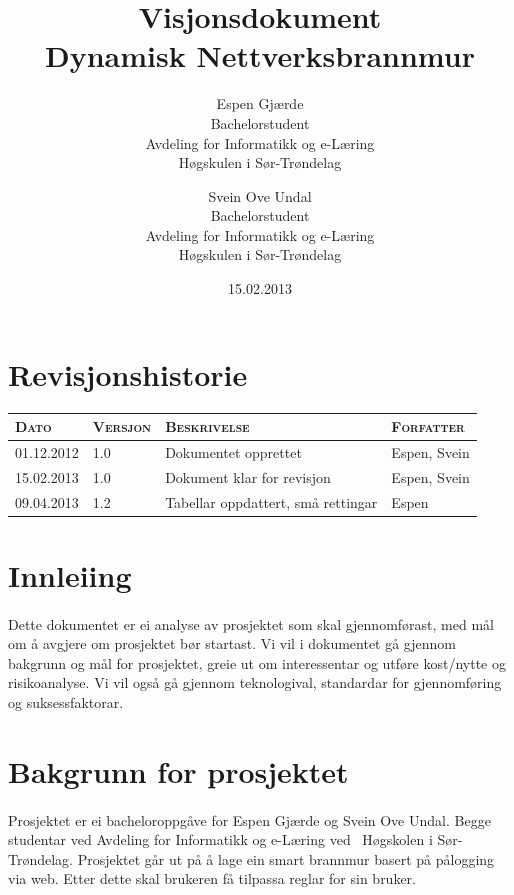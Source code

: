 \documentclass[nynorsk,12pt,a4paper]{article}
\title{Visjonsdokument\\
Dynamisk Nettverksbrannmur
}
\author{Espen Gjærde \\
Bachelorstudent \\
Avdeling for Informatikk og e-Læring \\
Høgskulen i Sør-Trøndelag \and Svein Ove Undal\\
Bachelorstudent \\
Avdeling for Informatikk og e-Læring \\
Høgskulen i Sør-Trøndelag}
\date{15.02.2013}
\begin{document}
\maketitle
\newpage

\section*{Revisjonshistorie}

\begin{table}[h!]
	\begin{tabular}{ l l l l }

		\textsc{Dato} & \textsc{Versjon} & \textsc{Beskrivelse} & \textsc{Forfatter} \\
		\hline 
		01.12.2012 & 1.0 & Dokumentet opprettet & Espen, Svein \\ 
		15.02.2013 & 1.0 & Dokument klar for revisjon & Espen, Svein \\ 
		09.04.2013 & 1.2 & Tabellar oppdattert, små rettingar & Espen \\ 
		\hline
	\end{tabular}
\end{table}

\newpage
\tableofcontents{}

\newpage

\section{Innleiing}
\paragraph{}
Dette dokumentet er ei analyse av prosjektet som skal gjennomførast, med mål om å avgjere om prosjektet bør startast. Vi vil i dokumentet gå gjennom bakgrunn og mål for prosjektet, greie ut om interessentar og utføre kost/nytte og risikoanalyse. Vi vil også gå gjennom teknologival, standardar for gjennomføring og suksessfaktorar.

\newpage
\section{Bakgrunn for prosjektet}
\paragraph{}
Prosjektet er ei bacheloroppgåve for Espen Gjærde og Svein Ove Undal. Begge studentar ved Avdeling for Informatikk og e-Læring ved \ Høgskolen i Sør-Trøndelag. Prosjektet går ut på å lage ein smart brannmur basert på pålogging via web. Etter dette skal brukeren få tilpassa reglar for sin bruker. 
\end{document}
